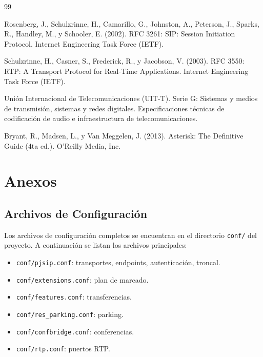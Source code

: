 \documentclass[12pt,a4paper]{article}
\begin{document}
\begin{thebibliography}{99}

Rosenberg, J., Schulzrinne, H., Camarillo, G., Johnston, A., Peterson, J., Sparks, R., Handley, M., y Schooler, E. (2002). RFC 3261: SIP: Session Initiation Protocol. Internet Engineering Task Force (IETF).

Schulzrinne, H., Casner, S., Frederick, R., y Jacobson, V. (2003). RFC 3550: RTP: A Transport Protocol for Real-Time Applications. Internet Engineering Task Force (IETF).

Unión Internacional de Telecomunicaciones (UIT-T). Serie G: Sistemas y medios de transmisión, sistemas y redes digitales. Especificaciones técnicas de codificación de audio e infraestructura de telecomunicaciones.

Bryant, R., Madsen, L., y Van Meggelen, J. (2013). Asterisk: The Definitive Guide (4ta ed.). O'Reilly Media, Inc.

\end{thebibliography}

\appendix
\section{Anexos}

\subsection{Archivos de Configuración}

Los archivos de configuración completos se encuentran en el directorio \texttt{conf/} del proyecto. A continuación se listan los archivos principales:

\begin{itemize}
    \item \texttt{conf/pjsip.conf}: transportes, endpoints, autenticación, troncal.
    \item \texttt{conf/extensions.conf}: plan de marcado.
    \item \texttt{conf/features.conf}: transferencias.
    \item \texttt{conf/res\_parking.conf}: parking.
    \item \texttt{conf/confbridge.conf}: conferencias.
    \item \texttt{conf/rtp.conf}: puertos RTP.
\end{itemize}
\end{document}
